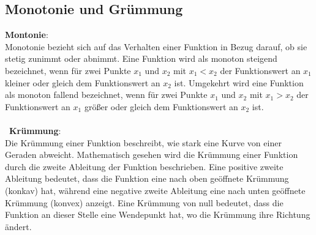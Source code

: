 \subsection{Monotonie und Grümmung}
\textbf{Montonie}: \\
Monotonie bezieht sich auf das Verhalten einer Funktion in Bezug darauf, 
ob sie stetig zunimmt oder abnimmt. 
Eine Funktion wird als monoton steigend bezeichnet, 
wenn für zwei Punkte $x_1$ und $x_2$ mit $x_1 < x_2$ der Funktionswert an $x_1$ kleiner oder gleich dem Funktionswert an $x_2$ ist. 
Umgekehrt wird eine Funktion als monoton fallend bezeichnet, 
wenn für zwei Punkte $x_1$ und $x_2$ mit $x_1>x_2$ der Funktionswert an $x_1$ größer oder gleich dem Funktionswert an $x_2$ ist. \\\\
\
\textbf{Krümmung}: \\
Die Krümmung einer Funktion beschreibt, wie stark eine Kurve von einer Geraden abweicht. 
Mathematisch gesehen wird die Krümmung einer Funktion durch die zweite Ableitung der Funktion beschrieben. 
Eine positive zweite Ableitung bedeutet, 
dass die Funktion eine nach oben geöffnete Krümmung (konkav) hat, 
während eine negative zweite Ableitung eine nach unten geöffnete Krümmung (konvex) anzeigt. 
Eine Krümmung von null bedeutet, dass die Funktion an dieser Stelle eine Wendepunkt hat, 
wo die Krümmung ihre Richtung ändert.

